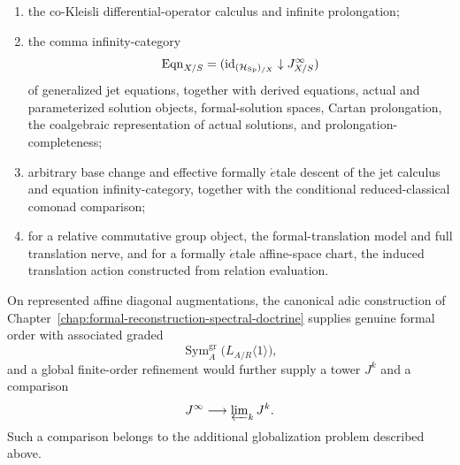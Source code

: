 \begin{theorem}
\begin{enumerate}
\item the co-Kleisli differential-operator calculus and infinite prolongation;

\item the comma infinity-category
\[
  \operatorname{Eqn}_{X/S}
  =
  (\operatorname{id}_{(\mathcal H_{\operatorname{Sp}})_{/X}}\downarrow J^\infty_{X/S})
\]
of generalized jet equations, together with derived equations, actual and
parameterized solution objects, formal-solution spaces, Cartan prolongation,
the coalgebraic representation of actual solutions, and prolongation-completeness;

\item arbitrary base change and effective formally \(\acute{e}\)tale descent
of the jet calculus and equation infinity-category, together with the
conditional reduced-classical comonad comparison;

\item for a relative commutative group object, the formal-translation model
and full translation nerve, and for a formally \(\acute{e}\)tale affine-space
chart, the induced translation action constructed from relation evaluation.
\end{enumerate}

On represented affine diagonal augmentations, the canonical adic construction
of Chapter~\ref{chap:formal-reconstruction-spectral-doctrine} supplies genuine
formal order with associated graded
\[
  \operatorname{Sym}^{\mathrm{gr}}_A
  \bigl(L_{A/R}\langle1\rangle\bigr),
\]
and a global finite-order refinement would further supply a tower \(J^k\)
and a comparison
\[
  J^\infty\longrightarrow\varprojlim\nolimits_kJ^k.
\]
Such a comparison belongs to the additional globalization problem described
above.
\end{theorem}

